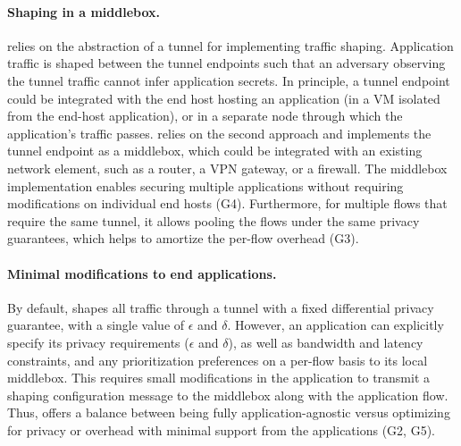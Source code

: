 \paragraph{Shaping in a middlebox.}
{\sys} relies on the abstraction of a tunnel for implementing traffic shaping.
Application traffic is shaped between the tunnel endpoints such that an
adversary observing the tunnel traffic cannot infer application secrets.
In principle, a tunnel endpoint could be integrated with the end host hosting an
application (\eg in a VM isolated from the end-host application), or in a
separate node through which the application's traffic passes.
{\sys} relies on the second approach and implements the tunnel endpoint as a
middlebox, which could be integrated with an existing network element, such as a
router, a VPN gateway, or a firewall.
The middlebox implementation enables securing multiple applications without
requiring modifications on individual end hosts (G4).
Furthermore, for multiple flows that require the same tunnel, it allows pooling
the flows under the same privacy guarantees, which helps to amortize the
per-flow overhead (G3).

\paragraph{Minimal modifications to end applications.}
By default, {\sys} shapes all traffic through a tunnel with a fixed differential
privacy guarantee, \ie with a single value of $\epsilon$ and $\delta$. However,
an application can explicitly specify its privacy requirements ($\epsilon$ and
$\delta$), as well as
bandwidth and latency constraints, and any prioritization preferences on a
per-flow basis to its local middlebox. This requires small modifications in the
application to transmit a shaping configuration message to the middlebox along
with the application flow. Thus, {\sys} offers a balance between being fully
application-agnostic versus optimizing for privacy or overhead with minimal
support from the applications (G2, G5).

